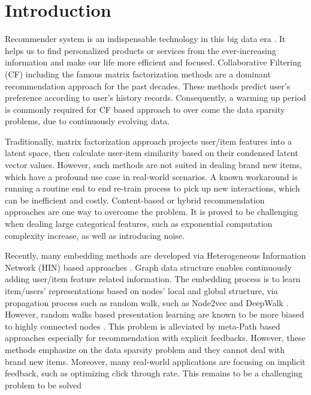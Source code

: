 \section{Introduction}

Recommender system is an indispensable technology in this big data era \cite{lu2015recommender}. It helps us to find personalized products or services from the ever-increasing information and make our life more efficient and focused. Collaborative Filtering (CF) including the famous matrix factorization methods are a dominant recommendation approach for the past decades. These methods predict user's preference according to user's history records. Consequently, a warming up period is commonly required for CF based approach to over come the data sparsity problems, due to continuously evolving data.

Traditionally, matrix factorization approach projects user/item features into a latent space, then calculate user-item similarity based on their condensed latent vector values. However, such methods are not suited in dealing brand new items, which have a profound use case in real-world scenarios. A known workaround is running a routine end to end re-train process to pick up new interactions, which can be inefficient and costly. Content-based or hybrid recommendation approaches are one way to overcome the problem. It is proved to be challenging when dealing large categorical features, such as exponential computation complexity increase, as well as introducing noise.

Recently, many embedding methods are developed via Heterogeneous Information Network (HIN) based approaches \cite{mao2016multirelational,wang2016member}. Graph data structure enables continuously adding user/item feature related information. The embedding process is to learn item/users' representations based on nodes' local and global structure, via propagation process such as random walk, such as Node2vec \cite{grover2016node2vec} and DeepWalk \cite{perozzi2014deepwalk}. However, random walks based presentation learning are known to be more biased to highly connected nodes \cite{sun2011pathsim}. This problem is alleviated by meta-Path based approaches \cite{dong2017metapath2vec} especially for recommendation with explicit feedbacks. However, these methods emphasize on the data sparsity problem and they cannot deal with brand new items. Moreover, many real-world applications are focusing on implicit feedback, such as optimizing click through rate. This remains to be a challenging problem to be solved 

